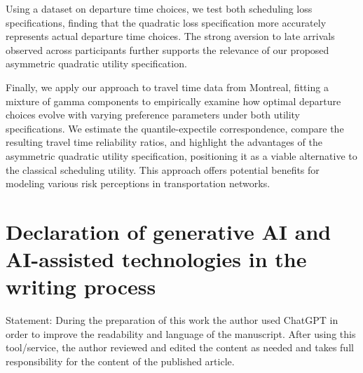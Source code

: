 \documentclass[preprint, 3p, authoryear]{elsarticle} %
\theoremstyle{definition}
\theoremstyle{definition}
\theoremstyle{definition}
\theoremstyle{definition}
\theoremstyle{remark}
\begin{document}
Using a dataset on departure time choices, we test both scheduling loss specifications, finding that the quadratic loss specification more accurately represents actual departure time choices. The strong aversion to late arrivals observed across participants further supports the relevance of our proposed asymmetric quadratic utility specification.

Finally, we apply our approach to travel time data from Montreal, fitting a mixture of gamma components to empirically examine how optimal departure choices evolve with varying preference parameters under both utility specifications. We estimate the quantile-expectile correspondence, compare the resulting travel time reliability ratios, and highlight the advantages of the asymmetric quadratic utility specification, positioning it as a viable alternative to the classical scheduling utility. This approach offers potential benefits for modeling various risk perceptions in transportation networks.

\hypertarget{declaration-of-generative-ai-and-ai-assisted-technologies-in-the-writing-process}{%
\section*{Declaration of generative AI and AI-assisted technologies in the writing process}\label{declaration-of-generative-ai-and-ai-assisted-technologies-in-the-writing-process}}

Statement: During the preparation of this work the author used ChatGPT in order to improve the readability and language of the manuscript. After using this tool/service, the author reviewed and edited the content as needed and takes full responsibility for the content of the published article.


\end{document}
